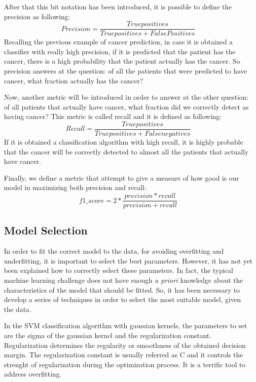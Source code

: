 \documentclass[aps,letterpaper,10pt]{revtex4}
\begin{document}
After that this bit notation has been introduced, it is possible to define the precision as following:
\begin{equation}
Precision= \frac{True positives}{True positives + False Positives}
\end{equation}
Recalling the previous example of cancer prediction, in case it is obtained a classifier with really high precision, if it is predicted that the patient has the cancer, there is a high probability that the patient actually has the cancer. So precision answers at the question: of all the patients that were predicted to have cancer, what fraction actually has the cancer? 

Now, another metric will be introduced in order to answer at the other question: of all patients that actually have cancer, what fraction did we correctly detect as having cancer? This metric is called recall and it is defined as following:
\begin{equation}
Recall = \frac{True positives}{True positives + False negatives}
\end{equation}
If it is obtained a classification algorithm with high recall, it is highly probable that the
cancer will be correctly detected to almost all the patients that actually have cancer.

Finally, we define a metric that attempt to give a measure of how good is our model in maximizing both precision and recall:
\begin{equation}
f1\_score = 2 * \frac{precision*recall}{precision+recall}
\end{equation}

\subsection{Model Selection}
In order to fit the correct model to the data, for avoiding overfitting and underfitting, it is important to select the best parameters. However, it has not yet been explained how to correctly select these parameters. In fact, the typical machine learning challenge does not have enough \textit{a priori} knowledge about the characteristics of the model that should be fitted. So, it has been necessary to develop a series of techniques in order to select the most suitable model, given the data. 

In the SVM classification algorithm with gaussian kernels, the parameters to set are the sigma of the gaussian kernel and the regularization constant. Regularization determines the regularity or smoothness of the obtained decision margin. The regularization constant is usually referred as C and it controls the strenght of regularization during the optimization process. It is a terrific tool to address overfitting. 
\end{document}
